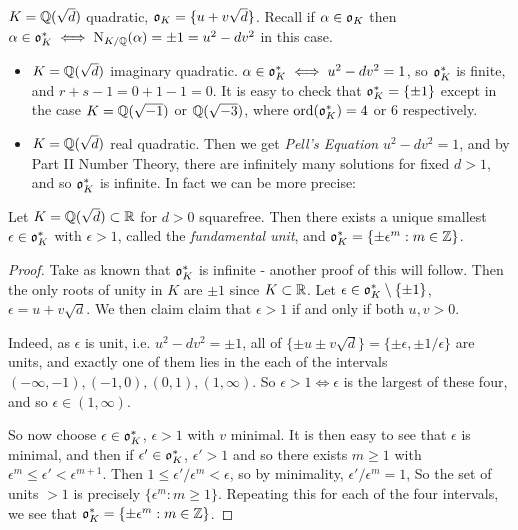 \documentclass[10pt,a4paper]{article}
\begin{document}
\example $K = \mathbb{Q}(\sqrt{d})$ quadratic, $\mathfrak{o}_K = \{u+v\sqrt{d}\}$. Recall if $\alpha \in \mathfrak{o}_K$ then $\alpha \in \mathfrak{o}_K^{\ast} \iff \operatorname{N}_{K/\mathbb{Q}}(\alpha) = \pm 1 = u^2-dv^2$ in this case. 

\begin{itemize}
\item $K = \mathbb{Q}(\sqrt{d})$ imaginary quadratic. $\alpha \in \mathfrak{o}_K^\ast \iff u^2-dv^2 = 1$, so $\mathfrak{o}_K^{\ast}$ is finite, and $r+s-1 = 0+1-1 = 0$. It is easy to check that $\mathfrak{o}_K^{\ast} = \{\pm 1\}$ except in the case $K = \mathbb{Q}(\sqrt{-1})$ or $\mathbb{Q}(\sqrt{-3})$, where $\operatorname{ord}(\mathfrak{o}_K^\ast) = 4$ or $6$ respectively.

\item $K = \mathbb{Q}(\sqrt{d})$ real quadratic. Then we get \emph{Pell's Equation} $u^2-dv^2 = 1$, and by Part II Number Theory, there are infinitely many solutions for fixed $d > 1$, and so $\mathfrak{o}_K^{\ast}$ is infinite. In fact we can be more precise:
\end{itemize}
\begin{theorem}
Let $K = \mathbb{Q}(\sqrt{d}) \subset \mathbb{R}$ for $d>0$ squarefree. Then there exists a unique smallest $\epsilon \in \mathfrak{o}_K^\ast$ with $\epsilon > 1$, called the \emph{fundamental unit}, and $\mathfrak{o}_K^\ast = \{\pm \epsilon^m : m \in \mathbb{Z}\}$.
\end{theorem}
\begin{proof}
Take as known that $\mathfrak{o}_K^\ast$ is infinite - another proof of this will follow. Then the only roots of unity in $K$ are $\pm 1$ since $K \subset \mathbb{R}$. Let $\epsilon \in \mathfrak{o}_K^{\ast} \setminus \{\pm 1\}$, $\epsilon = u +v\sqrt{d}$. We then claim claim that $\epsilon > 1$ if and only if both $u, v > 0$. 

Indeed, as $\epsilon$ is unit, i.e. $u^2-dv^2 = \pm 1$, all of $\{\pm u \pm v \sqrt{d}\} = \{\pm \epsilon, \pm 1/\epsilon\}$ are units, and exactly one of them lies in the each of the intervals $(-\infty, -1),(-1,0),(0,1),(1, \infty)$. So $\epsilon > 1 \iff \epsilon$ is the largest of these four, and so $\epsilon \in (1, \infty)$.

So now choose $\epsilon \in \mathfrak{o}_K^\ast$, $\epsilon > 1$ with $v$ minimal. It is then easy to see that $\epsilon$ is minimal, and then if $\epsilon' \in \mathfrak{o}_K^\ast$, $\epsilon' > 1$ and so there exists $m \geq 1$ with $\epsilon^m \leq \epsilon' < \epsilon^{m+1}$. Then $1 \leq \epsilon'/\epsilon^m < \epsilon$, so by minimality, $\epsilon'/\epsilon^m = 1$, So the set of units $>1$ is precisely $\{\epsilon^m : m \geq 1\}$. Repeating this for each of the four intervals, we see that $\mathfrak{o}_K^{\ast} = \{\pm \epsilon^m : m \in \mathbb{Z}\}$.
\end{proof}
\end{document}

